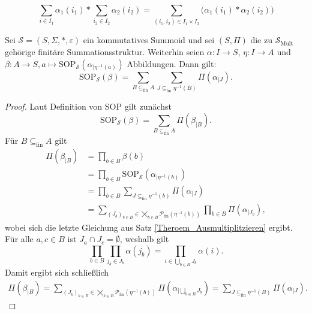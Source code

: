 \documentclass{article}
\begin{document}
\begin{example}
  \begin{equation*}
    \sum_{i \in I_1}\alpha_1(i_1) \ast \sum_{i_2 \in I_2}\alpha_2(i_2) = \sum_{(i_1, i_2) \in I_1 \times I_2} \Big( \alpha_1(i_1) \ast \alpha_2(i_2) \Big)
  \end{equation*}
\end{example}

\begin{lemma}\label{Lemma_SOPTeilsumme}
  Sei $\mathcal{S} = (S, \Sigma, \ast, \varepsilon)$ ein kommutatives Summoid und
  sei $(S, \Pi)$ die zu $\mathcal{S}_\text{Mult}$ gehörige finitäre Summationsstruktur.
  Weiterhin seien $\alpha \colon I \to S$, $\eta \colon I \to A$ und $\beta \colon A \to S, a \mapsto \text{SOP}_\mathcal{S}(\alpha_{\mid \eta^{-1}(a)})$ Abbildungen.
  Dann gilt:
  \begin{equation*}
    \text{SOP}_\mathcal{S}(\beta) = \sum_{B \subseteq_\text{fin} A}\sum_{J \subseteq_\text{fin} \eta^{-1}(B)}\Pi(\alpha_{\mid J}).
  \end{equation*}
\end{lemma}
\begin{proof}
  Laut Definition von SOP gilt zunächst
  \begin{equation*}
    \text{SOP}_\mathcal{S}(\beta) = \sum_{B \subseteq_\text{fin} A}\Pi(\beta_{\mid B}).
  \end{equation*}
  Für $B \subseteq_\text{fin} A$ gilt
  \begin{align*}
    \Pi(\beta_{\mid B}) 
    &= \prod_{b \in B}\beta(b) \\
    &= \prod_{b \in B}\text{SOP}_\mathcal{S}(\alpha_{\mid \eta^{-1}(b)}) \\
    &= \prod_{b \in B}\sum_{J \subseteq_\text{fin}\eta^{-1}(b)}\Pi(\alpha_{\mid J}) \\
    &= \sum_{(J_b)_{b \in B} \in \bigtimes_{b \in B}\mathcal{P}_\text{fin}(\eta^{-1}(b))}\prod_{b \in B}\Pi(\alpha_{\mid J_b}),
  \end{align*}
  wobei sich die letzte Gleichung aus Satz \ref {Theroem_Ausmultiplitzieren} ergibt.
  Für alle $a, c \in B$ ist $J_a \cap J_c = \emptyset$, weshalb gilt
  \begin{equation*}
    \prod_{b \in B}\prod_{j_b \in J_b}\alpha(j_b) = \prod_{i \in \bigcup_{b \in B}J_b}\alpha(i).
  \end{equation*}
  Damit ergibt sich schließlich
  \begin{align*}
    \Pi(\beta_{\mid B}) 
    = \sum_{(J_b)_{b \in B} \in \bigtimes_{b \in B}\mathcal{P}_\text{fin}(\eta^{-1}(b))}\Pi(\alpha_{\mid \bigcup_{b \in B}J_b}) 
    = \sum_{J \subseteq_\text{fin}\eta^{-1}(B)}\Pi(\alpha_{\mid J}). 
  \end{align*}
\end{proof}
\end{document}
